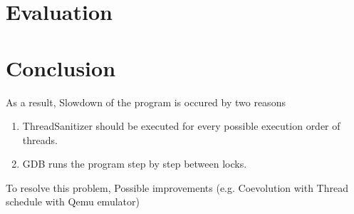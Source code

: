 \documentclass[sigconf]{acmart}
\begin{document}
\section{Evaluation}


\section{Conclusion}
As a result,
Slowdown of the program is occured by two reasons
\begin{enumerate}
    \item ThreadSanitizer should be executed for every possible execution order of threads.
    \item GDB runs the program step by step between locks.
\end{enumerate}
To resolve this problem, 
Possible improvements (e.g. Coevolution with Thread schedule with Qemu emulator)
\end{document}
